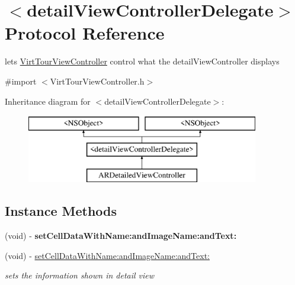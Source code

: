 \hypertarget{protocoldetail_view_controller_delegate-p}{\section{$<$detail\-View\-Controller\-Delegate$>$ Protocol Reference}
\label{protocoldetail_view_controller_delegate-p}
}


lets \hyperlink{interface_virt_tour_view_controller}{Virt\-Tour\-View\-Controller} control what the detail\-View\-Controller displays  




{\ttfamily \#import $<$Virt\-Tour\-View\-Controller.\-h$>$}

Inheritance diagram for $<$detail\-View\-Controller\-Delegate$>$\-:\begin{figure}[H]
\begin{center}
\leavevmode
\includegraphics[height=3.000000cm]{protocoldetail_view_controller_delegate-p}
\end{center}
\end{figure}
\subsection*{Instance Methods}
\begin{DoxyCompactItemize}
\item 
\hypertarget{protocoldetail_view_controller_delegate-p_a7db6bd35718ac78cf9d0ace37a65ff05}{(void) -\/ {\bfseries set\-Cell\-Data\-With\-Name\-:and\-Image\-Name\-:and\-Text\-:}}\label{protocoldetail_view_controller_delegate-p_a7db6bd35718ac78cf9d0ace37a65ff05}

\item 
(void) -\/ \hyperlink{protocoldetail_view_controller_delegate-p_a7db6bd35718ac78cf9d0ace37a65ff05}{set\-Cell\-Data\-With\-Name\-:and\-Image\-Name\-:and\-Text\-:}
\begin{DoxyCompactList}\small\item\em sets the information shown in detail view \end{DoxyCompactList}\end{DoxyCompactItemize}


